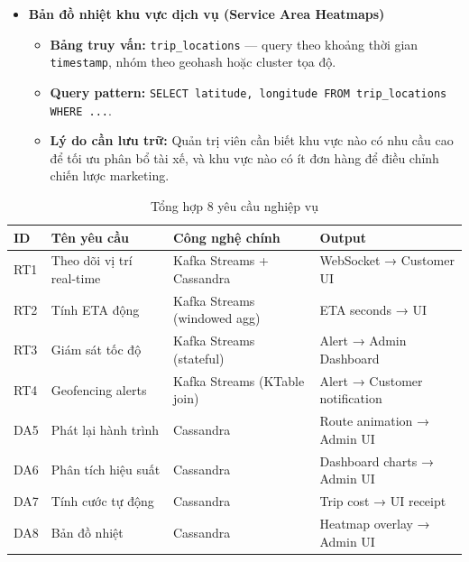 \begin{itemize}
\begin{itemize}
        \item \textbf{Công thức:} \texttt{cost = 3.00 + (0.50 × distance\_km) + (0.10 × duration\_min)}.
        \item \textbf{Truy vấn hiển thị:} \texttt{SELECT distance\_km, duration\_min, cost FROM trip\_metadata WHERE trip\_id = ?}
        \item \textbf{Lý do cần lưu trữ:} Cước phí chuyến đi phải minh bạch và được tính toán chuẩn xác dựa trên dữ liệu di chuyển thực tế thay vì mức giá ước lượng ban đầu. Việc lưu trữ \texttt{trip\_metadata} đảm bảo tính bất biến (immutable) của hóa đơn sau khi chuyến đi kết thúc, giúp cả tài xế và khách hàng có thể đối soát lại bất kỳ lúc nào.
    \end{itemize}
\item \textbf{Bản đồ nhiệt khu vực dịch vụ (Service Area Heatmaps)}
\begin{itemize}
    \item \textbf{Bảng truy vấn:} \texttt{trip\_locations} — query theo khoảng thời gian \texttt{timestamp}, nhóm theo geohash hoặc cluster tọa độ.
    \item \textbf{Query pattern:} \texttt{SELECT latitude, longitude FROM trip\_locations WHERE ...}.
    \item \textbf{Lý do cần lưu trữ:} Quản trị viên cần biết khu vực nào có nhu cầu cao để tối ưu phân bổ tài xế, và khu vực nào có ít đơn hàng để điều chỉnh chiến lược marketing.
\end{itemize}
    
\end{itemize}

\bigskip
\begin{table}[H]
\centering
\caption{Tổng hợp 8 yêu cầu nghiệp vụ}
\label{tab:requirements-summary}
\begin{tabular}{|p{1.5cm}|p{4cm}|p{3.5cm}|p{3.5cm}|}
\hline
\textbf{ID} & \textbf{Tên yêu cầu} & \textbf{Công nghệ chính} & \textbf{Output} \\
\hline
RT1 & Theo dõi vị trí real-time & Kafka Streams + Cassandra & WebSocket → Customer UI \\
\hline
RT2 & Tính ETA động & Kafka Streams (windowed agg) & ETA seconds → UI \\
\hline
RT3 & Giám sát tốc độ & Kafka Streams (stateful) & Alert → Admin Dashboard \\
\hline
RT4 & Geofencing alerts & Kafka Streams (KTable join) & Alert → Customer notification \\
\hline
DA5 & Phát lại hành trình & Cassandra & Route animation → Admin UI \\
\hline
DA6 & Phân tích hiệu suất & Cassandra & Dashboard charts → Admin UI \\
\hline
DA7 & Tính cước tự động & Cassandra & Trip cost → UI receipt \\
\hline
DA8 & Bản đồ nhiệt & Cassandra & Heatmap overlay → Admin UI \\
\hline
\end{tabular}
\end{table}

